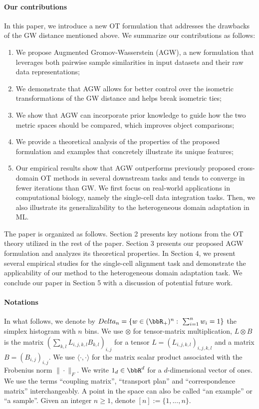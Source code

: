 \paragraph{Our contributions}
In this paper, we introduce a new OT formulation that addresses the drawbacks of the
GW distance mentioned above. We summarize our contributions as follows:
\begin{enumerate}
    \item We propose Augmented Gromov-Wasserstein (AGW), a new formulation that leverages
    both pairwise sample similarities in input datasets and their raw data representations;
    \item We demonstrate that AGW allows for better control over the isometric transformations
    of the GW distance and helps break isometric ties;
    \item We show that AGW can incorporate prior knowledge to guide how the two metric spaces
    should be compared, which improves object comparisons; %
    \item We provide a theoretical analysis of the properties of the proposed formulation
    and examples that concretely illustrate its unique features;
    \item Our empirical results show that AGW outperforms previously proposed
    cross-domain OT methods in several downstream tasks and tends to converge in fewer iterations
    than GW. We first focus on real-world applications in computational biology,
    namely the single-cell data integration tasks. Then, we also illustrate its generalizability
    to the heterogeneous domain adaptation in ML.
\end{enumerate}
The paper is organized as follows. Section 2 presents key notions from the OT theory
utilized in the rest of the paper. Section 3 presents our proposed AGW formulation and
analyzes its theoretical properties. In Section 4, we present several empirical studies
for the single-cell alignment task and demonstrate the applicability of our method to
the heterogeneous domain adaptation task. We conclude our paper in Section 5 with
a discussion of potential future work.

\paragraph{Notations} In what follows, we denote by
$Delta_{n}=\{w \in (\bbR_{+})^{n}:\ \sum_{i=1}^{n} w_{i}=1\}$
the simplex histogram with $n$ bins. We use $\otimes$ for tensor-matrix multiplication,
\ie $L \otimes B$ is the matrix $(\sum_{k,l} L_{i,j,k,l} B_{k,l})_{i,j}$ for a tensor
$L =(L_{i,j,k,l})_{i,j,k,l}$ and a matrix $B = (B_{i,j})_{i,j}$.
We use $\langle \cdot, \cdot \rangle$ for the matrix scalar product associated with
the Frobenius norm $\|\cdot\|_{F}$. We write $1_d \in \bbR^d$ for a
$d$-dimensional vector of ones.
We use the terms ``coupling matrix'', ``transport plan'' and ``correspondence matrix'' interchangeably.
A point in the space can also be called ``an example'' or ``a sample''.
Given an integer $n \geq 1$, denote $[n] := \{ 1, ..., n\}$.

